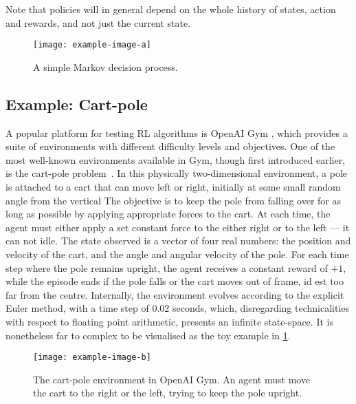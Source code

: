 Note that policies will in general depend on the whole history of states, action and rewards, and not just the current state.

\begin{figure}
    \centering
    \texttt{[image: example-image-a]}

    \caption{A simple Markov decision process.}
    \label{fig:mdp}
\end{figure}


\subsection{Example: Cart-pole}
A popular platform for testing RL algorithms is OpenAI Gym \autocite{gym}, which provides a suite of environments with different difficulty levels and objectives.
One of the most well-known environments available in Gym, though first introduced earlier, is the cart-pole problem~\autocite{barto1983}.
In this physically two-dimensional environment, a pole is attached to a cart that can move left or right, initially at some small random angle from the vertical
The objective is to keep the pole from falling over for as long as possible by applying appropriate forces to the cart.
At each time, the agent must either apply a set constant force to the either right or to the left — it can not idle.
The state observed is a vector of four real numbers: the position and velocity of the cart, and the angle and angular velocity of the pole.
For each time step where the pole remains upright, the agent receives a constant reward of $+1$, while the episode ends if the pole falls or the cart moves out of frame, id est too far from the centre.
Internally, the environment evolves according to the explicit Euler method, with a time step of $0.02$ seconds\footnotemark, which, disregarding technicalities with respect to floating point arithmetic, presents an infinite state-space.
It is nonetheless far to complex to be visualised as the toy example in \cref{fig:mdp}.


\begin{figure}
    \centering
    \texttt{[image: example-image-b]}
    \caption[
        The cart-pole environment in OpenAI Gym.
    ]{
        The cart-pole environment in OpenAI Gym.
        An agent must move the cart to the right or the left, trying to keep the pole upright.
    }
    \label{fig:cartpole}
\end{figure}

